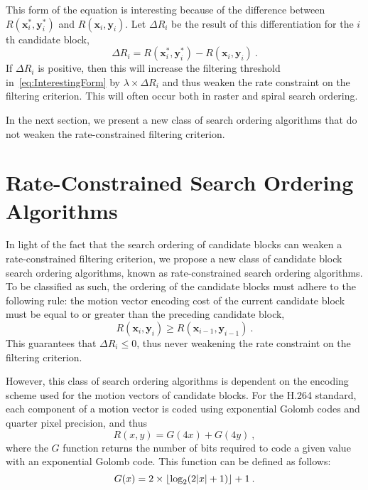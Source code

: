\documentclass{article}
\DeclarePairedDelimiter{\floor}{\lfloor}{\rfloor}
\newcommand{\beq}{\begin{dmath}}
\newcommand{\eeq}{\end{dmath}}
\newcommand{\mGolomb}{G}
\newcommand{\vx}{\mathbf{x}}
\newcommand{\vy}{\mathbf{y}}
\begin{document}
This form of the equation is interesting because of the difference between
$R(\vx^*_i,\vy^*_i)$ and $R(\vx_i,\vy_i)$. Let $\Delta R_i$ be the result of this
differentiation for the $i$th candidate block,
\vspace{-0.2em}
\beq
\Delta R_i = R(\vx^*_i,\vy^*_i) - R(\vx_i,\vy_i)\:.
\eeq
\vspace{-0.2em}
If $\Delta R_i$ is positive, then this will increase the filtering threshold
in~\eqref{eq:InterestingForm} by $\lambda\!\times\!\Delta R_i$ and thus weaken the
rate constraint on the filtering criterion.
This will often occur both in raster and spiral search ordering.

In the next section, we present a new class of search ordering algorithms that
do not weaken the rate-constrained filtering criterion.

\vspace{-0.5em}
\section{Rate-Constrained Search Ordering Algorithms}
\label{sec:searchOrder}
\vspace{-0.2em}
In light of the fact that the search ordering of candidate blocks can weaken a
rate-constrained filtering criterion, we propose a new class of candidate block
search ordering algorithms, known as rate-constrained search ordering
algorithms. To be classified as such, the ordering of the candidate blocks must
adhere to the following rule: the motion vector encoding cost of the current
candidate block must be equal to or greater than the preceding candidate block,
\vspace{-0.2em}
\beq
R(\vx_i, \vy_i) \geqslant R(\vx_{i-1}, \vy_{i-1})\:.
\label{eq:SearchOrdering}
\eeq
\vspace{-0.2em}
This guarantees that $\Delta R_i \leqslant 0$, thus never weakening the
rate constraint on the filtering criterion.

However, this class of search ordering algorithms is dependent on the encoding
scheme used for the motion vectors of candidate blocks. For the H.264 standard,
each component of a motion vector is coded using exponential Golomb codes and
quarter pixel precision, and thus
\vspace{-0.2em}
\beq
R(x,y) = \mGolomb(4x) + \mGolomb(4y)\:,
\eeq
\vspace{-0.2em}
where the $\mGolomb$ function returns the number of bits required to code a
given value with an exponential Golomb code. This function can be defined as
follows:
\vspace{-0.2em}
\beq
\mGolomb(x) = 2 \times \floor{\log_2(2|x| + 1)} + 1 \:.
\eeq
\vspace{-0.2em}
\end{document}
